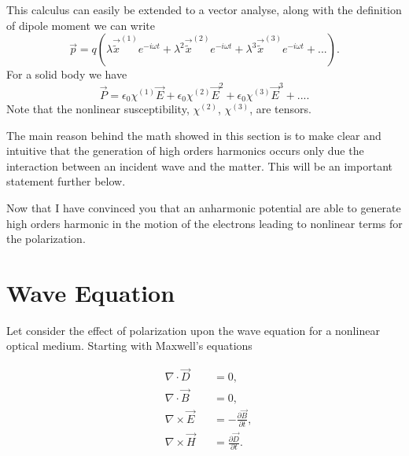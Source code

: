 This calculus can easily be extended to a vector analyse, along with the definition of dipole moment we can write
\begin{equation}
    \vec{p} = q\left(\lambda\vec{\tilde{x}}^{(1)}e^{-i\omega t}+\lambda^2\vec{\tilde{x}}^{(2)}e^{-i\omega t}+\lambda^3\vec{\tilde{x}}^{(3)}e^{-i\omega t}+... \right).
\end{equation}
For a solid body we have
\begin{equation}
    \vec{P} = \epsilon_0\chi^{(1)}\vec{E} + \epsilon_0\chi^{(2)}\vec{E}^2+\epsilon_0\chi^{(3)}\vec{E}^3+....
\label{eq:nonlim_pol}
\end{equation}
Note that the nonlinear susceptibility, $\chi^{(2)}$, $\chi^{(3)}$, are tensors.

The main reason behind the math showed in this section is to make clear and intuitive that the generation of high orders harmonics occurs only due the interaction between an incident wave and the matter. This will be an important statement further below. 

Now that I have convinced you that an anharmonic potential are able to generate high orders harmonic in the motion of the electrons leading to nonlinear terms for the polarization.%

\section{Wave Equation}

Let consider the effect of polarization upon the wave equation for a nonlinear optical medium. Starting with Maxwell's equations

\begin{subequations}
    \begin{alignat}{2}
        &\nabla\cdot\vec{D}  &&= 0,\\
        &\nabla\cdot\vec{B}  &&= 0,\\
        &\nabla\times\vec{E} &&= -\frac{\partial\vec{B}}{\partial t},\\ 
        &\nabla\times\vec{H} &&= \frac{\partial\vec{D}}{\partial t}.
    \end{alignat}
    \label{eq:max_eq}
\end{subequations}

